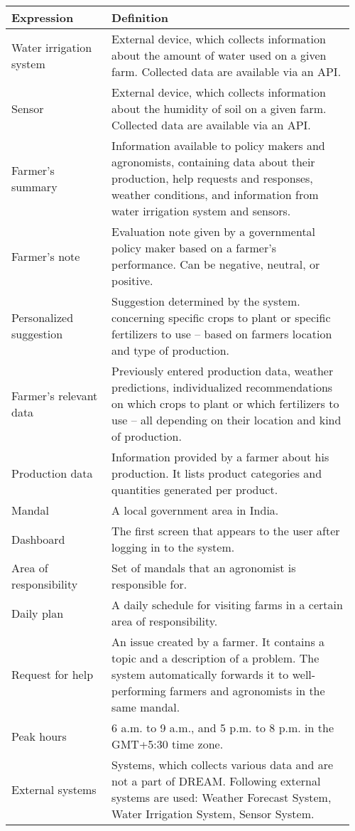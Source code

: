 \begin{center}
	\begin{tabular}{@{}p{0.28\linewidth} p{0.68\linewidth}@{}}
		\toprule
		\textbf{Expression}     & \textbf{Definition}\\
		\midrule
		Water irrigation system & External device, which collects information about the amount of water used on a given farm. Collected data are available via an API. \\
        Sensor                  & External device, which collects information about the humidity of soil on a given farm. Collected data are available via an API.\\
        Farmer's summary        & Information available to policy makers and agronomists, containing data about their production, help requests and responses, weather conditions, and information from water irrigation system and sensors.\\
        Farmer's note           & Evaluation note given by a governmental policy maker based on a farmer's performance. Can be negative, neutral, or positive.\\
        Personalized suggestion & Suggestion determined by the system. concerning specific crops to plant or specific fertilizers to use – based on farmers location and type of production.\\
        Farmer's relevant data  & Previously entered production data, weather predictions, individualized recommendations on which crops to plant or which fertilizers to use – all depending on their location and kind of production.\\
        Production data         & Information provided by a farmer about his production. It lists product categories and quantities generated per product.\\
        Mandal                  & A local government area in India.\\
        Dashboard               & The first screen that appears to the user after logging in to the system.\\
        Area of responsibility  & Set of mandals that an agronomist is responsible for.\\
        Daily plan              & A daily schedule for visiting farms in a certain area of responsibility.\\
        Request for help        & An issue created by a farmer. It contains a topic and a description of a problem. The system automatically forwards it to well-performing farmers and agronomists in the same mandal.\\
        Peak hours              & 6 a.m. to 9 a.m., and 5 p.m. to 8 p.m. in the GMT+5:30 time zone.\\
        External systems        & Systems, which collects various data and are not a part of DREAM. Following external systems are used: Weather Forecast System, Water Irrigation System, Sensor System.
	\end{tabular}
\end{center}

